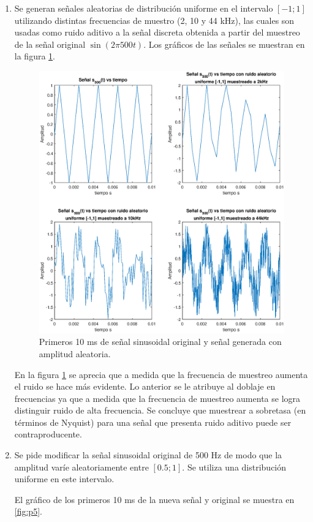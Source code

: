 \begin{enumerate}
    
    
    
    \item Se generan señales aleatorias de distribución uniforme en el intervalo $[-1; 1]$ utilizando distintas frecuencias de muestro (2, 10 y 44 kHz), las cuales son usadas como ruido aditivo a la señal discreta obtenida a partir del muestreo de la señal original $\sin(2\pi 500 t)$. Los gráficos de las señales se muestran en la figura \ref{fig:p4}.
    
    \begin{figure}[H]
        \centering
        \includegraphics[width = .6\linewidth ]{Imagenes/p4.eps}
        \caption{Primeros 10 ms de señal sinusoidal original y señal generada con amplitud aleatoria.}
        \label{fig:p4}
    \end{figure}
    
    En la figura \ref{fig:p4} se aprecia que a medida que la frecuencia de muestreo aumenta el ruido se hace más evidente. Lo anterior se le atribuye al doblaje en frecuencias ya que a medida que la frecuencia de muestreo aumenta se logra distinguir ruido de alta frecuencia. Se concluye que muestrear a sobretasa (en términos de Nyquist) para una señal que presenta ruido aditivo puede ser contraproducente.
    
    \item Se pide modificar la señal sinusoidal original de 500 Hz de modo que la amplitud varíe aleatoriamente entre $[0.5;1]$. Se utiliza una distribución uniforme en este intervalo.
    
    El gráfico de los primeros 10 ms de la nueva señal y original se muestra en \ref{fig:p5}.
    

\end{enumerate}

